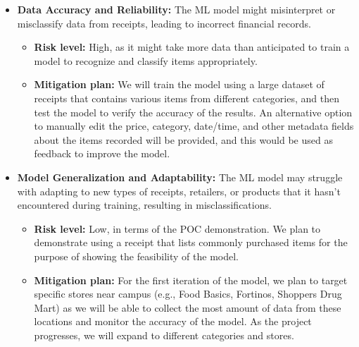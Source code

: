 \documentclass{article}
\begin{document}
\begin{itemize}
    \item \textbf{Data Accuracy and Reliability:} The ML model might
    misinterpret or misclassify data from receipts, leading to incorrect
    financial records.
    \begin{itemize}
        \item \textbf{Risk level:} High, as it might take more data than
        anticipated to train a model to recognize and classify items
        appropriately.
        \item \textbf{Mitigation plan:} We will train the model using a large
        dataset of receipts that contains various items from different
        categories, and then test the model to verify the accuracy of the
        results. An alternative option to manually edit the price, category,
        date/time, and other metadata fields about the items recorded will be
        provided, and this would be used as feedback to improve the model.
    \end{itemize}
    
    \item \textbf{Model Generalization and Adaptability:} The ML model may
    struggle with adapting to new types of receipts, retailers, or products that
    it hasn’t encountered during training, resulting in misclassifications.
    \begin{itemize}
        \item \textbf{Risk level:} Low, in terms of the POC demonstration. We
        plan to demonstrate using a receipt that lists commonly purchased items
        for the purpose of showing the feasibility of the model.
        \item \textbf{Mitigation plan:} For the first iteration of the model, we
        plan to target specific stores near campus (e.g., Food Basics, Fortinos,
        Shoppers Drug Mart) as we will be able to collect the most amount of
        data from these locations and monitor the accuracy of the model. As the
        project progresses, we will expand to different categories and stores.
    \end{itemize}
    

\end{itemize}
\end{document}
